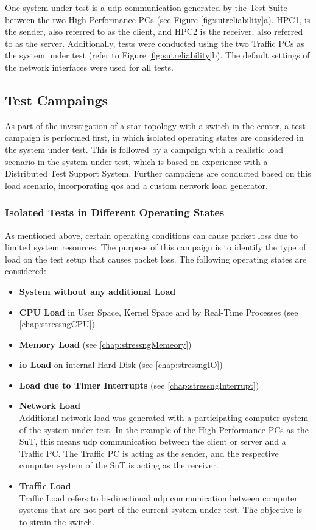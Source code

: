 One system under test is a \ac{udp} communication generated by the Test Suite between the two High-Performance PCs (see Figure \ref{fig:sutreliability}a). HPC1, is the sender, also referred to as the client, and HPC2 is the receiver, also referred to as the server. Additionally, tests were conducted using the two Traffic PCs as the system under test (refer to Figure \ref{fig:sutreliability}b). The default settings of the network interfaces were used for all tests.

\subsection{Test Campaings}
As part of the investigation of a star topology with a switch in the center, a test campaign is performed first, in which isolated operating states are considered in the system under test. This is followed by a campaign with a realistic load scenario in the system under test, which is based on experience with a Distributed Test Support System. Further campaigns are conducted based on this load scenario, incorporating \ac{qos} and a custom network load generator.

\subsubsection{Isolated Tests in Different Operating States} \label{chap:relcamp1}
As mentioned above, certain operating conditions can cause packet loss due to limited system resources. The purpose of this campaign is to identify the type of load on the test setup that causes packet loss. The following operating states are considered:

\begin{itemize}
  \item \textbf{System without any additional Load}
  \item \textbf{\ac{CPU} Load} in User Space, Kernel Space and by Real-Time Processes (see \ref{chap:stressngCPU})
  \item \textbf{Memory Load} (see \ref{chap:stressngMemeory})
  \item \textbf{\ac{io} Load} on internal Hard Disk (see \ref{chap:stressngIO})
  \item \textbf{Load due to Timer Interrupts} (see \ref{chap:stressngInterrupt})
  \item \textbf{Network Load} \\
  		Additional network load was generated with a participating computer system of the system under test. In the example of the High-Performance PCs as the SuT, this means \ac{udp} communication between the client or server and a Traffic PC. The Traffic PC is acting as the sender, and the respective computer system of the SuT is acting as the receiver.
  		
  \item \textbf{Traffic Load} \\
 		Traffic Load refers to bi-directional \ac{udp} communication between computer systems that are not part of the current system under test. The objective is to strain the switch.
\end{itemize}

